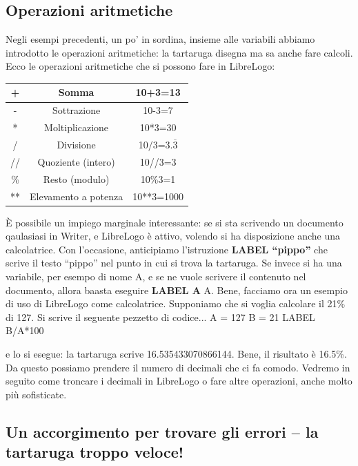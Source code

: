 \subsection{Operazioni aritmetiche}

Negli esempi precedenti, un po' in sordina, insieme alle variabili abbiamo introdotto le operazioni aritmetiche: la tartaruga disegna ma sa anche fare calcoli. Ecco le operazioni aritmetiche che si possono fare in  LibreLogo:

\begin{center}
\begin{tabular}{| c | c | c |}
\hline
+ & 	Somma 			& 	10+3=13 		\\ \hline
- & 	Sottrazione 		& 	10-3=7	 		\\ \hline
* & 	Moltiplicazione 	&	10*3=30 		\\ \hline
/ & 	Divisione 		& 	10/3=3.$\overline{3}$ 	\\ \hline
// & 	Quoziente (intero) 	& 	10//3=3 		\\ \hline
\% & 	Resto (modulo) 		& 	10\%3=1 		\\ \hline
** & 	Elevamento a potenza 	& 	10**3=1000 		\\ \hline
\end{tabular}
\end{center}

È possibile un impiego marginale interessante: se si sta scrivendo un documento qaulasiasi in Writer, e LibreLogo è attivo, volendo si ha disposizione anche una calcolatrice. Con l'occasione, anticipiamo l'istruzione \textbf{LABEL “pippo”} che  scrive il testo “pippo” nel punto in cui si trova la tartaruga. Se invece si ha una variabile, per esempo di nome A, e se ne vuole scrivere il contenuto nel documento, allora baasta eseguire \textbf{LABEL A} A. Bene, facciamo ora un esempio di uso di LibreLogo come calcolatrice. Supponiamo che si voglia calcolare il 21\% di 127. Si scrive il seguente pezzetto di codice...
A = 127
B = 21
LABEL B/A*100

e lo si esegue: la tartaruga scrive  16.535433070866144. Bene, il risultato è 16.5\%. Da questo possiamo prendere il numero di decimali che ci fa comodo. Vedremo in seguito come troncare i decimali in LibreLogo o fare altre operazioni, anche molto più sofisticate. 

\subsection{Un accorgimento per trovare gli errori – la tartaruga troppo veloce!}

